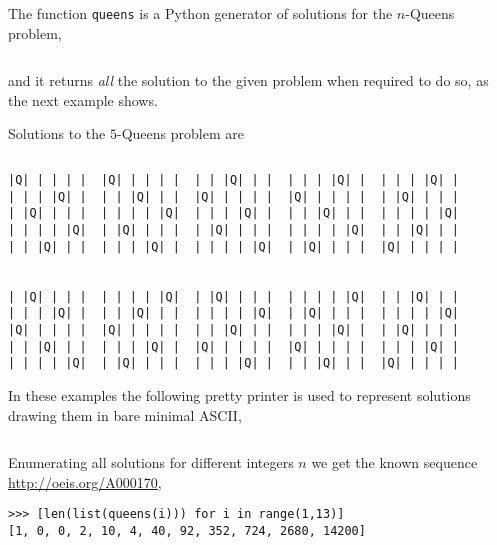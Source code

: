 The function \verb|queens| is a Python generator of solutions for the $n$-Queens problem,
\inputminted[baselinestretch=0.8,firstline=3,lastline=28]
    {python}{backtracking/queens.py}
\noindent and it returns \textit{all} the solution to the given problem when
required to do so, as the next example shows.

\begin{example}
Solutions to the $5$-Queens problem are
\inputminted[baselinestretch=0.8]{python}{backtracking/5queens-enumeration-snippet.py}
\begin{Verbatim}[baselinestretch=0.1]
|Q| | | | |  |Q| | | | |  | | |Q| | |  | | | |Q| |  | | | |Q| |
| | | |Q| |  | | |Q| | |  |Q| | | | |  |Q| | | | |  | |Q| | | |
| |Q| | | |  | | | | |Q|  | | | |Q| |  | | |Q| | |  | | | | |Q|
| | | | |Q|  | |Q| | | |  | |Q| | | |  | | | | |Q|  | | |Q| | |
| | |Q| | |  | | | |Q| |  | | | | |Q|  | |Q| | | |  |Q| | | | |


| |Q| | | |  | | | | |Q|  | |Q| | | |  | | | | |Q|  | | |Q| | |
| | | |Q| |  | | |Q| | |  | | | | |Q|  | |Q| | | |  | | | | |Q|
|Q| | | | |  |Q| | | | |  | | |Q| | |  | | | |Q| |  | |Q| | | |
| | |Q| | |  | | | |Q| |  |Q| | | | |  |Q| | | | |  | | | |Q| |
| | | | |Q|  | |Q| | | |  | | | |Q| |  | | |Q| | |  |Q| | | | |
\end{Verbatim}
\end{example}

In these examples the following pretty printer is used to represent solutions
drawing them in bare minimal ASCII,
\inputminted[baselinestretch=0.8,firstline=30, lastline=39]
    {python}{backtracking/queens.py}

Enumerating all solutions for different integers $n$ we get the known sequence
\url{http://oeis.org/A000170}, 
\begin{verbatim}
>>> [len(list(queens(i))) for i in range(1,13)]
[1, 0, 0, 2, 10, 4, 40, 92, 352, 724, 2680, 14200]
\end{verbatim}

